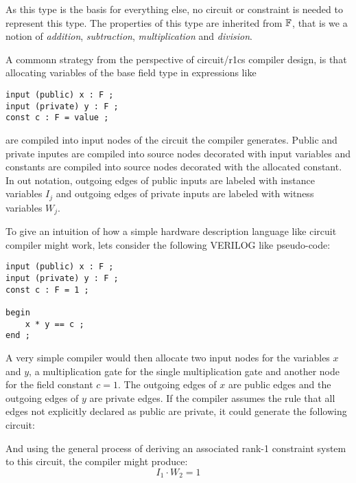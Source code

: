 As this type is the basis for everything else, no circuit or constraint is needed to represent this type. The properties of this type are inherited from $\mathbb{F}$, that is we a notion of \textit{addition}, \textit{subtraction}, \textit{multiplication} and \textit{division}. 

A commonn strategy from the perspective of circuit/r1cs compiler design, is that allocating variables of the base field type in expressions like
\begin{lstlisting}
input (public) x : F ; 
input (private) y : F ; 
const c : F = value ; 
\end{lstlisting} 
are compiled into input nodes of the circuit the compiler generates. Public and private inputes are compiled into source nodes decorated with input variables and constants are compiled into source nodes decorated with the allocated constant. In out notation, outgoing edges of public inputs are labeled with instance variables $I_j$ and outgoing edges of private inputs are labeled with witness variables $W_j$.
\begin{example} To give an intuition of how a simple hardware description language like circuit compiler might work, lets consider the following VERILOG like pseudo-code:
\begin{lstlisting}
input (public) x : F ; 
input (private) y : F ; 
const c : F = 1 ; 

begin
	x * y == c ;
end ;
\end{lstlisting}
A very simple compiler would then allocate two input nodes for the variables $x$ and $y$, a multiplication gate for the single multiplication gate and another node for the field constant $c=1$. The outgoing edges of $x$ are public edges and the outgoing edges of $y$ are private edges. If the compiler assumes the rule that all edges not explicitly declared as public are private, it could generate the following circuit: 
\begin{center}
\end{center} 
And using the general process of deriving an associated rank-1 constraint system to this circuit, the compiler might produce:
$$
I_1 \cdot W_2 =1
$$
\end{example} 
